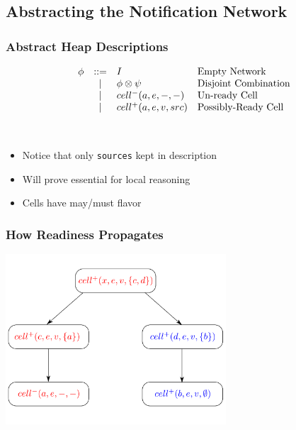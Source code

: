 \documentclass[svgnames]{beamer}
\begin{document}
\subsection{Abstracting the Notification Network}
\begin{frame}
  \frametitle{Abstract Heap Descriptions}

  \begin{displaymath}
    \begin{array}{lcll}
      \phi & ::= & I                    & \mbox{Empty Network} \\
           &  |  & \phi \otimes \psi    & \mbox{Disjoint Combination} \\ 
           &  |  & cell^{-}({a}, {e}, -, -)       & \mbox{Un-ready Cell} \\
           &  |  & cell^{+}({a}, {e}, {v}, {src}) & \mbox{Possibly-Ready Cell} \\
    \end{array}
  \end{displaymath}

  \ \\

  \begin{itemize}
    \item \pause Notice that only \texttt{sources} kept in description
    \item \pause Will prove essential for local reasoning
    \item \pause Cells have may/must flavor
  \end{itemize}
\end{frame}

\begin{frame}
  \frametitle{How Readiness Propagates}

  \begin{center}
  \includegraphics[height=2.5in]{conditional-validity-0.pdf}
  \end{center}

\end{frame}
\end{document}

